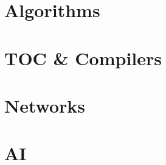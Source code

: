 \needspace{95pt}

\hypertarget{rev-formula--algorithms}{%
\section{Algorithms}\label{rev-formula--algorithms}}



\needspace{95pt}

\hypertarget{rev-formula--toc--compilers}{%
\section{TOC \& Compilers}\label{rev-formula--toc--compilers}}



\needspace{95pt}

\hypertarget{rev-formula--networks}{%
\section{Networks}\label{rev-formula--networks}}



\needspace{95pt}

\hypertarget{rev-formula--ai}{%
\section{AI}\label{rev-formula--ai}}


